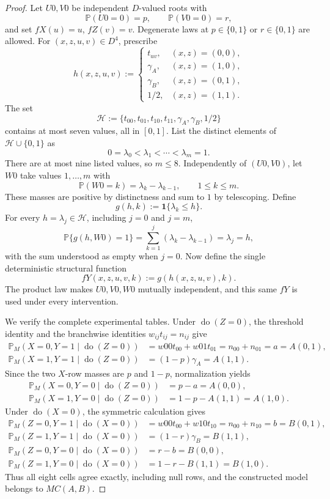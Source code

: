\documentclass{article}
\begin{document}
\begin{proof}
Let \(U0,V0\) be independent \(D\)-valued roots with
\[
\mathbb P(U0=0)=p,
\qquad
\mathbb P(V0=0)=r,
\]
and set \(fX(u)=u\), \(fZ(v)=v\).  Degenerate laws at \(p\in\{0,1\}\) or \(r\in\{0,1\}\) are allowed.  For \((x,z,u,v)\in D^4\), prescribe
\[
h(x,z,u,v):=
\begin{cases}
t_{uv},&(x,z)=(0,0),\\
\gamma_A,&(x,z)=(1,0),\\
\gamma_B,&(x,z)=(0,1),\\
1/2,&(x,z)=(1,1).
\end{cases}
\]
The set
\[
\mathcal H:=\{t_{00},t_{01},t_{10},t_{11},\gamma_A,\gamma_B,1/2\}
\]
contains at most seven values, all in \([0,1]\).  List the distinct elements of \(\mathcal H\cup\{0,1\}\) as
\[
0=\lambda_0<\lambda_1<\cdots<\lambda_m=1.
\]
There are at most nine listed values, so \(m\le8\).  Independently of \((U0,V0)\), let \(W0\) take values \(1,\ldots,m\) with
\[
\mathbb P(W0=k)=\lambda_k-\lambda_{k-1},
\qquad 1\le k\le m.
\]
These masses are positive by distinctness and sum to \(1\) by telescoping.  Define
\[
g(h,k):=\mathbf 1\{\lambda_k\le h\}.
\]
For every \(h=\lambda_j\in\mathcal H\), including \(j=0\) and \(j=m\),
\[
\mathbb P\{g(h,W0)=1\}
=\sum_{k=1}^{j}(\lambda_k-\lambda_{k-1})
=\lambda_j=h,
\]
with the sum understood as empty when \(j=0\).  Now define the single deterministic structural function
\[
fY(x,z,u,v,k):=g(h(x,z,u,v),k).
\]
The product law makes \(U0,V0,W0\) mutually independent, and this same \(fY\) is used under every intervention.

We verify the complete experimental tables.  Under \(\operatorname{do}(Z=0)\), the threshold identity and the branchwise identities \(w_{ij}t_{ij}=n_{ij}\) give
\[
\begin{aligned}
\mathbb P_M(X=0,Y=1\mid\operatorname{do}(Z=0))
&=w00t_{00}+w01t_{01}=n_{00}+n_{01}=a=A(0,1),\\
\mathbb P_M(X=1,Y=1\mid\operatorname{do}(Z=0))
&=(1-p)\gamma_A=A(1,1).
\end{aligned}
\]
Since the two \(X\)-row masses are \(p\) and \(1-p\), normalization yields
\[
\begin{aligned}
\mathbb P_M(X=0,Y=0\mid\operatorname{do}(Z=0))&=p-a=A(0,0),\\
\mathbb P_M(X=1,Y=0\mid\operatorname{do}(Z=0))&=1-p-A(1,1)=A(1,0).
\end{aligned}
\]
Under \(\operatorname{do}(X=0)\), the symmetric calculation gives
\[
\begin{aligned}
\mathbb P_M(Z=0,Y=1\mid\operatorname{do}(X=0))
&=w00t_{00}+w10t_{10}=n_{00}+n_{10}=b=B(0,1),\\
\mathbb P_M(Z=1,Y=1\mid\operatorname{do}(X=0))
&=(1-r)\gamma_B=B(1,1),\\
\mathbb P_M(Z=0,Y=0\mid\operatorname{do}(X=0))&=r-b=B(0,0),\\
\mathbb P_M(Z=1,Y=0\mid\operatorname{do}(X=0))&=1-r-B(1,1)=B(1,0).
\end{aligned}
\]
Thus all eight cells agree exactly, including null rows, and the constructed model belongs to \(MC(A,B)\).


\end{proof}
\end{document}
